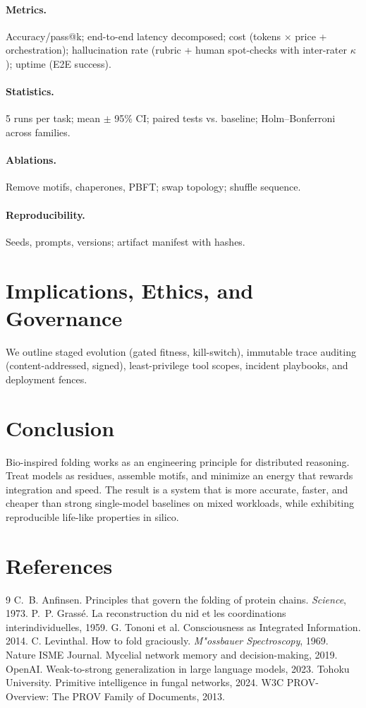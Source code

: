 \documentclass[11pt]{article}
\begin{document}
\paragraph{Metrics.} Accuracy/pass@k; end-to-end latency decomposed; cost (tokens $\times$ price + orchestration); hallucination rate (rubric + human spot-checks with inter-rater $\kappa$); uptime (E2E success).\\
\paragraph{Statistics.} 5 runs per task; mean $\pm$ 95\% CI; paired tests vs. baseline; Holm--Bonferroni across families.\\
\paragraph{Ablations.} Remove motifs, chaperones, PBFT; swap topology; shuffle sequence.\\
\paragraph{Reproducibility.} Seeds, prompts, versions; artifact manifest with hashes.
\section{Implications, Ethics, and Governance}
We outline staged evolution (gated fitness, kill-switch), immutable trace auditing (content-addressed, signed), least-privilege tool scopes, incident playbooks, and deployment fences.
\section{Conclusion}
Bio-inspired folding works as an engineering principle for distributed reasoning. Treat models as residues, assemble motifs, and minimize an energy that rewards integration and speed. The result is a system that is more accurate, faster, and cheaper than strong single-model baselines on mixed workloads, while exhibiting reproducible life-like properties in silico.
\section*{References}
\begin{thebibliography}{9}
 C.~B. Anfinsen. Principles that govern the folding of protein chains. \emph{Science}, 1973.
 P.~P. Grass\'e. La reconstruction du nid et les coordinations interindividuelles, 1959.
 G. Tononi et al. Consciousness as Integrated Information. 2014.
 C. Levinthal. How to fold graciously. \emph{M{"o}ssbauer Spectroscopy}, 1969.
 Nature ISME Journal. Mycelial network memory and decision-making, 2019.
 OpenAI. Weak-to-strong generalization in large language models, 2023.
 Tohoku University. Primitive intelligence in fungal networks, 2024.
 W3C PROV-Overview: The PROV Family of Documents, 2013.
\end{thebibliography}
\appendix
\end{document}
